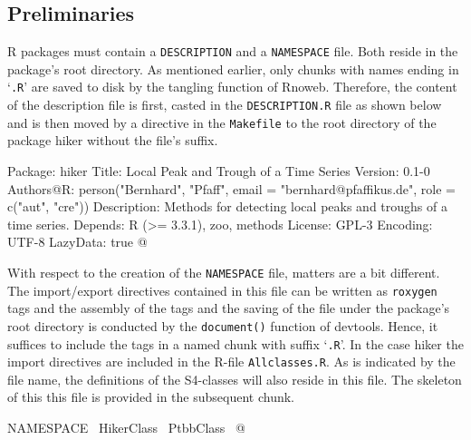 \documentclass[a4paper]{article}
\newcommand{\pkg}[1]{{\fontseries{b}\selectfont #1}}
\begin{document}
\subsection{Preliminaries}
\label{S3SS1}

R packages must contain a \verb?DESCRIPTION? and a \verb?NAMESPACE?
file. Both reside in the package's root directory. As mentioned
earlier, only chunks with names ending in `\verb?.R?' are saved to disk
by the tangling function of \pkg{Rnoweb}. Therefore, the content
of the description file is first, casted in the \verb?DESCRIPTION.R?
file as shown below and is then moved by a directive in the
\verb?Makefile? to the root directory of the package \pkg{hiker} without
the file's suffix.

\nwenddocs{}\endmoddef\let\nwnotused=\nwoutput{}
Package: hiker
Title: Local Peak and Trough of a Time Series
Version: 0.1-0
Authors@R: person("Bernhard", "Pfaff", email = "bernhard@pfaffikus.de",
                  role = c("aut", "cre"))
Description: Methods for detecting local peaks and troughs of a time series.
Depends: R (>= 3.3.1), zoo, methods
License: GPL-3
Encoding: UTF-8
LazyData: true
\nwnotused{DESCRIPTION.R}\nwendcode{}@

With respect to the creation of the \verb?NAMESPACE? file, matters are a
bit different. The import/export directives contained in this file can
be written as \verb?roxygen? tags and the assembly of the tags and the
saving of the file under the package's root directory is conducted by
the \verb?document()? function of \pkg{devtools}. Hence, it suffices to
include the tags in a named chunk with suffix `\verb?.R?'. In the case
\pkg{hiker} the import directives are included in the R-file
\verb?Allclasses.R?. As is indicated by the file name, the definitions of
the S4-classes will also reside in this file. The skeleton of this
this file is provided in the subsequent chunk.

\nwenddocs{}\endmoddef\let\nwnotused=\nwoutput{}
\LA{}NAMESPACE~{\nwtagstyle{}}\RA{}
\LA{}HikerClass~{\nwtagstyle{}}\RA{}
\LA{}PtbbClass~{\nwtagstyle{}}\RA{}
\nwnotused{Allclasses.R}\nwendcode{}@
\end{document}

